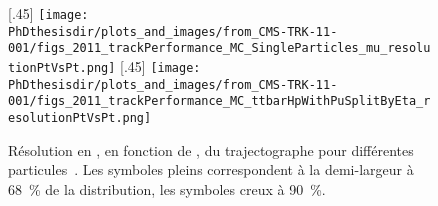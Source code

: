 \begin{figure}[h]
\centering
{}[.45\textwidth]
{\texttt{[image: \\PhDthesisdir/plots\_and\_images/from\_CMS-TRK-11-001/figs\_2011\_trackPerformance\_MC\_SingleParticles\_mu\_resolutionPtVsPt.png]}}
\hfill
{}[.45\textwidth]
{\texttt{[image: \\PhDthesisdir/plots\_and\_images/from\_CMS-TRK-11-001/figs\_2011\_trackPerformance\_MC\_ttbarHpWithPuSplitByEta\_resolutionPtVsPt.png]}}
\caption[Résolution en \pT\ du trajectographe.]{Résolution en \pT, en fonction de \pT, du trajectographe pour différentes particules~\cite{CMS-TRK-11-001}. Les symboles pleins correspondent à la demi-largeur à \SI{68}{\%} de la distribution, les symboles creux à \SI{90}{\%}.}
\label{fig-chapter-LHC-section-CMS-subsec-tracker-pT-resolution}
\end{figure}
